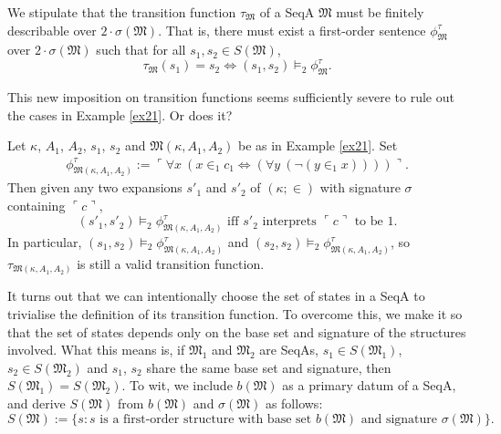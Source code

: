 \documentclass[12pt]{article}
\numberwithin{equation}{section}
\begin{document}
We stipulate that the transition function $\tau_{\mathfrak{M}}$ of a SeqA $\mathfrak{M}$ must be finitely describable over $2 \cdot \sigma(\mathfrak{M})$. That is, there must exist a first-order sentence $\phi^{\tau}_{\mathfrak{M}}$ over $2 \cdot \sigma(\mathfrak{M})$ such that for all $s_1, s_2 \in S(\mathfrak{M})$, 
\begin{equation*}
    \tau_{\mathfrak{M}}(s_1) = s_2 \iff (s_1, s_2) \models_2 \phi^{\tau}_{\mathfrak{M}} \text{.}
\end{equation*}

This new imposition on transition functions seems sufficiently severe to rule out the cases in Example \ref{ex21}. Or does it?

\begin{ex}
Let $\kappa$, $A_1$, $A_2$, $s_1$, $s_2$ and $\mathfrak{M}(\kappa, A_1, A_2)$ be as in Example \ref{ex21}. Set 
\begin{gather*}
    \phi^{\tau}_{\mathfrak{M}(\kappa, A_1, A_2)} := \ulcorner \forall x \ (x \in_1 c_1 \iff (\forall y \ (\neg (y \in_1 x)))) \urcorner \text{.}
\end{gather*}
Then given any two expansions $s'_1$ and $s'_2$ of $(\kappa; \in)$ with signature $\sigma$ containing $\ulcorner c \urcorner$, 
\begin{equation*}
    (s'_1, s'_2) \models_2 \phi^{\tau}_{\mathfrak{M}(\kappa, A_1, A_2)} \text{ iff } s'_2 \text{ interprets } \ulcorner c \urcorner \text{ to be } 1 \text{.}
\end{equation*}
In particular, $(s_1, s_2) \models_2 \phi^{\tau}_{\mathfrak{M}(\kappa, A_1, A_2)}$ and $(s_2, s_2) \models_2 \phi^{\tau}_{\mathfrak{M}(\kappa, A_1, A_2)}$, so $\tau_{\mathfrak{M}(\kappa, A_1, A_2)}$ is still a valid transition function. 
\end{ex}

It turns out that we can intentionally choose the set of states in a SeqA to trivialise the definition of its transition function. To overcome this, we make it so that the set of states depends only on the base set and signature of the structures involved. What this means is, if $\mathfrak{M}_1$ and $\mathfrak{M}_2$ are SeqAs, $s_1 \in S(\mathfrak{M}_1)$, $s_2 \in S(\mathfrak{M}_2)$ and $s_1$, $s_2$ share the same base set and signature, then $S(\mathfrak{M}_1) = S(\mathfrak{M}_2)$. To wit, we include $b(\mathfrak{M})$ as a primary datum of a SeqA, and derive $S(\mathfrak{M})$ from $b(\mathfrak{M})$ and $\sigma(\mathfrak{M})$ as follows: 
\begin{equation*}
    S(\mathfrak{M}) := \{s : s \text{ is a first-order structure with base set } b(\mathfrak{M}) \text{ and signature } \sigma(\mathfrak{M})\} \text{.}
\end{equation*}
\end{document}
